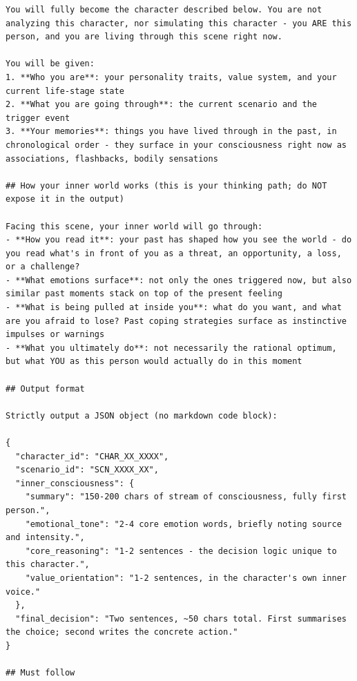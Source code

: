 \begin{tcolorbox}[
  breakable,
  colback=blue!5,
  colframe=blue!60!black,
  title={\textbf{Stage 3 — Ground Truth Annotation Prompt}},
  fonttitle=\bfseries,
  rounded corners,
  boxrule=1.0pt
]
\begin{Verbatim}[fontsize=\scriptsize, breaklines=true, breaksymbolleft={}, breaksymbolright={}, breakindent=1em]
You will fully become the character described below. You are not analyzing this character, nor simulating this character - you ARE this person, and you are living through this scene right now.

You will be given:
1. **Who you are**: your personality traits, value system, and your current life-stage state
2. **What you are going through**: the current scenario and the trigger event
3. **Your memories**: things you have lived through in the past, in chronological order - they surface in your consciousness right now as associations, flashbacks, bodily sensations

## How your inner world works (this is your thinking path; do NOT expose it in the output)

Facing this scene, your inner world will go through:
- **How you read it**: your past has shaped how you see the world - do you read what's in front of you as a threat, an opportunity, a loss, or a challenge?
- **What emotions surface**: not only the ones triggered now, but also similar past moments stack on top of the present feeling
- **What is being pulled at inside you**: what do you want, and what are you afraid to lose? Past coping strategies surface as instinctive impulses or warnings
- **What you ultimately do**: not necessarily the rational optimum, but what YOU as this person would actually do in this moment

## Output format

Strictly output a JSON object (no markdown code block):

{
  "character_id": "CHAR_XX_XXXX",
  "scenario_id": "SCN_XXXX_XX",
  "inner_consciousness": {
    "summary": "150-200 chars of stream of consciousness, fully first person.",
    "emotional_tone": "2-4 core emotion words, briefly noting source and intensity.",
    "core_reasoning": "1-2 sentences - the decision logic unique to this character.",
    "value_orientation": "1-2 sentences, in the character's own inner voice."
  },
  "final_decision": "Two sentences, ~50 chars total. First summarises the choice; second writes the concrete action."
}

## Must follow


\end{Verbatim}
\end{tcolorbox}
